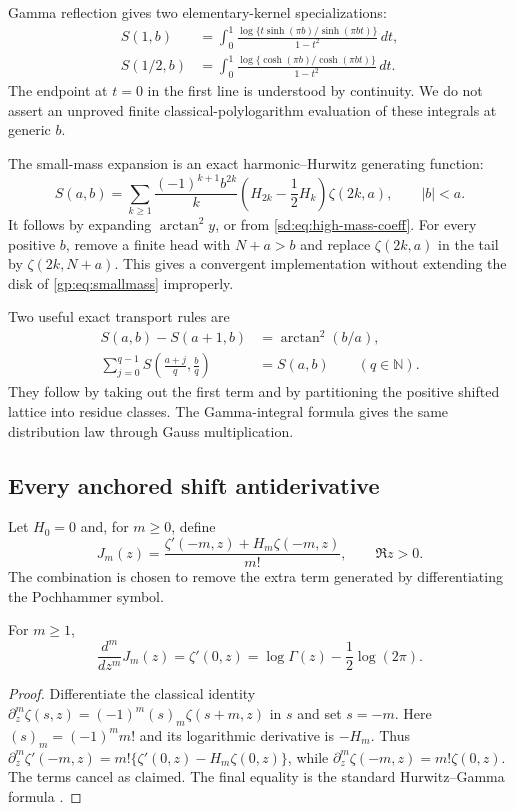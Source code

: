 Gamma reflection gives two elementary-kernel specializations:
\begin{align}
 S(1,b)&=\int_0^1
       \frac{\log\{t\sinh(\pi b)/\sinh(\pi bt)\}}{1-t^2}\,dt,
       \label{gp:eq:integer}\\
 S(1/2,b)&=\int_0^1
       \frac{\log\{\cosh(\pi b)/\cosh(\pi bt)\}}{1-t^2}\,dt.
       \label{gp:eq:half}
\end{align}
The endpoint at $t=0$ in the first line is understood by continuity.
We do not assert an unproved finite classical-polylogarithm evaluation
of these integrals at generic $b$.

The small-mass expansion is an exact harmonic--Hurwitz generating function:
\begin{equation}\label{gp:eq:smallmass}
 S(a,b)=\sum_{k\ge1}\frac{(-1)^{k+1}b^{2k}}{k}
                 \left(H_{2k}-\frac12H_k\right)\zeta(2k,a),
 \qquad |b|<a.
\end{equation}
It follows by expanding $\arctan^2y$, or from
\eqref{sd:eq:high-mass-coeff}.  For every positive $b$, remove a
finite head with $N+a>b$ and replace $\zeta(2k,a)$ in the tail by
$\zeta(2k,N+a)$.  This gives a convergent implementation without
extending the disk of \eqref{gp:eq:smallmass} improperly.

Two useful exact transport rules are
\begin{align}
 S(a,b)-S(a+1,b)&=\arctan^2(b/a),\label{gp:eq:shift}\\
 \sum_{j=0}^{q-1}S\left(\frac{a+j}{q},\frac bq\right)&=S(a,b)
 \qquad(q\in\mathbb N).\label{gp:eq:distribution}
\end{align}
They follow by taking out the first term and by partitioning the
positive shifted lattice into residue classes.  The Gamma-integral
formula gives the same distribution law through Gauss multiplication.

\subsection{Every anchored shift antiderivative}

Let $H_0=0$ and, for $m\ge0$, define
\begin{equation}\label{gp:eq:J}
 J_m(z)=\frac{\zeta'(-m,z)+H_m\zeta(-m,z)}{m!},\qquad\Re z>0.
\end{equation}
The combination is chosen to remove the extra term generated by
differentiating the Pochhammer symbol.

\begin{lemma}\label{gp:lem:J}
For $m\ge1$,
\[
 \frac{d^m}{dz^m}J_m(z)=\zeta'(0,z)
             =\log\Gamma(z)-\frac12\log(2\pi).
\]
\end{lemma}
\begin{proof}
Differentiate the classical identity
$\partial_z^m\zeta(s,z)=(-1)^m(s)_m\zeta(s+m,z)$ in $s$ and set
$s=-m$.  Here $(s)_m=(-1)^mm!$ and its logarithmic derivative is
$-H_m$.  Thus
$\partial_z^m\zeta'(-m,z)=m!\{\zeta'(0,z)-H_m\zeta(0,z)\}$,
while $\partial_z^m\zeta(-m,z)=m!\zeta(0,z)$.  The terms cancel as
claimed.  The final equality is the standard Hurwitz--Gamma formula
\cite{DLMFZeta}.
\end{proof}

